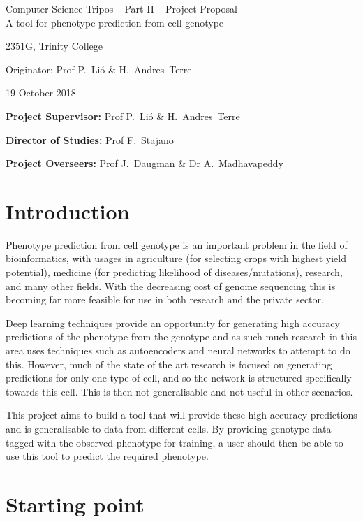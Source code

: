 \documentclass[12pt,a4paper,twoside,openany]{article}
\begin{document}
\begin{center}
\Large
Computer Science Tripos -- Part II -- Project Proposal\\[4mm]
\LARGE
A tool for phenotype prediction from cell genotype

\large
2351G, Trinity College

Originator: Prof P.~Li\'o \& H.~Andres~Terre

19 October 2018
\end{center}

\vspace{5mm}

\textbf{Project Supervisor:} Prof P.~Li\'o \& H.~Andres~Terre

\textbf{Director of Studies:} Prof F.~Stajano

\textbf{Project Overseers:} Prof J.~Daugman  \& Dr A.~Madhavapeddy


\section*{Introduction}

Phenotype prediction from cell genotype is an important problem in the field of bioinformatics, with usages in agriculture (for selecting crops with highest yield potential), medicine (for predicting likelihood of diseases/mutations), research, and many other fields. With the decreasing cost of genome sequencing this is becoming far more feasible for use in both research and the private sector.

Deep learning techniques provide an opportunity for generating high accuracy predictions of the phenotype from the genotype and as such much research in this area uses techniques such as autoencoders and neural networks to attempt to do this. However, much of the state of the art research is focused on generating predictions for only one type of cell, and so the network is structured specifically towards this cell. This is then not generalisable and not useful in other scenarios.

This project aims to build a tool that will provide these high accuracy predictions and is generalisable to data from different cells. By providing genotype data tagged with the observed phenotype for training, a user should then be able to use this tool to predict the required phenotype.

\section*{Starting point}
\end{document}
